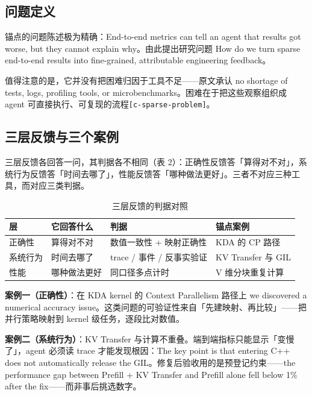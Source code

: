 \subsection{问题定义}

锚点的问题陈述极为精确：End-to-end metrics can tell an agent that results got worse, but they cannot explain why。由此提出研究问题 How do we turn sparse end-to-end results into fine-grained, attributable engineering feedback。


值得注意的是，它并没有把困难归因于工具不足——原文承认 no shortage of tests, logs, profiling tools, or microbenchmarks。困难在于把这些观察组织成 agent 可直接执行、可复现的流程{\scriptsize\texttt{[c-\hspace{0pt}sparse-\hspace{0pt}problem]}}。


\subsection{三层反馈与三个案例}

三层反馈各回答一问，其判据各不相同（表 2）：正确性反馈答「算得对不对」，系统行为反馈答「时间去哪了」，性能反馈答「哪种做法更好」。三者不对应三种工具，而对应三类判据。


\begin{table}[t]
\centering
\footnotesize
\setlength{\tabcolsep}{4pt}
\caption{三层反馈的判据对照}
\label{tab:1}
\begin{tabular}{llll}
\toprule
层 & 它回答什么 & 判据 & 锚点案例 \\
\midrule
正确性 & 算得对不对 & 数值一致性 + 映射正确性 & KDA 的 CP 路径 \\
系统行为 & 时间去哪了 & trace / 事件 / 反事实验证 & KV Transfer 与 GIL \\
性能 & 哪种做法更好 & 同口径多点计时 & V 维分块重复计算 \\
\bottomrule
\end{tabular}
\end{table}

\textbf{案例一（正确性）}：在 KDA kernel 的 Context Parallelism 路径上 we discovered a numerical accuracy issue。这类问题的可验证性来自「先建映射、再比较」——把并行策略映射到 kernel 级任务，逐段比对数值。


\textbf{案例二（系统行为）}：KV Transfer 与计算不重叠。端到端指标只能显示「变慢了」，agent 必须读 trace 才能发现根因：The key point is that entering C++ does not automatically release the GIL。修复后验收用的是预登记约束——the performance gap between Prefill + KV Transfer and Prefill alone fell below 1\% after the fix——而非事后挑选数字。


